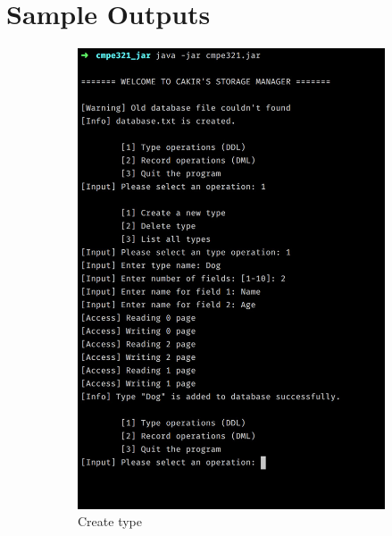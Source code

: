 \documentclass[12pt,a4paper]{article}
\begin{document}
\section{Sample Outputs}
\hfill
\begin{figure}
\centering
\begin{subfigure}{.5\textwidth}
  \centering
  \includegraphics[width=.90\linewidth]{ss1.jpg}
  \caption{Create type}
  \label{fig:sub1}
\end{subfigure}%
\begin{subfigure}{.5\textwidth}
  \centering

\end{subfigure}
\end{figure}
\end{document}
